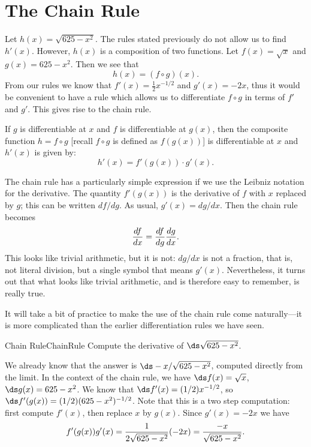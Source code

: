 \section{The Chain Rule}\label{sec:ChainRule}
Let $h(x)=\sqrt{625-x^2}$.
The rules stated previously do not allow us to find $h'(x)$.
However, $h(x)$ is a composition of two functions.
Let $f(x)=\sqrt x$ and $g(x)=625-x^2$.
Then we see that 
$$h(x)=(f\circ g)(x).$$
From our rules we know that $f'(x)=\frac{1}{2}x^{-1/2}$ and $g'(x)=-2x$, thus it would be convenient to have a rule which allows us to differentiate $f\circ g$ in terms of $f'$ and $g'$.
This gives rise to the chain rule.

\begin{formulabox}
If $g$ is differentiable at $x$ and $f$ is differentiable at $g(x)$, then the composite function $h=f\circ g$ [recall $f\circ g$ is defined as $f(g(x))$] is differentiable at $x$ and $h'(x)$ is given by:
$$h'(x)=f'(g(x))\cdot g'(x).$$
\end{formulabox}

The chain rule has a particularly simple expression if we use the
Leibniz notation for the derivative. The quantity $f'(g(x))$ is the
derivative of $f$ with $x$ replaced by $g$; this can be written 
$df/dg$. As usual, $g'(x)=dg/dx$. Then the chain rule becomes
$${df\over dx} = {df\over dg}{dg\over dx}.$$
This looks like trivial arithmetic, but it is not: $dg/dx$ is not a
fraction, that is, not literal division, but a single symbol that
means $g'(x)$. Nevertheless, it turns out that what looks like trivial
arithmetic, and is therefore easy to remember, is really true.

It will take a bit of practice to make the use of the chain rule come
naturally---it is more complicated than the earlier differentiation
rules we have seen.

\begin{example}{Chain Rule}{ChainRule}
Compute the derivative of $\ds \sqrt{625-x^2}$.
\end{example}

\begin{solution} 
 We already know that the
answer is $\ds -x/\sqrt{625-x^2}$, computed directly from the limit. In
the context of the chain rule, we have $\ds f(x)=\sqrt{x}$,
$\ds g(x)=625-x^2$. We know that $\ds f'(x)=(1/2)x^{-1/2}$, so $\ds f'(g(x))=
(1/2)(625-x^2)^{-1/2}$. Note that this is a two step computation:
first compute $f'(x)$, then replace $x$ by $g(x)$. Since $g'(x)=-2x$
we have
$$f'(g(x))g'(x)={1\over 2\sqrt{625-x^2}}(-2x)={-x\over
    \sqrt{625-x^2}}.
$$
\end{solution}

